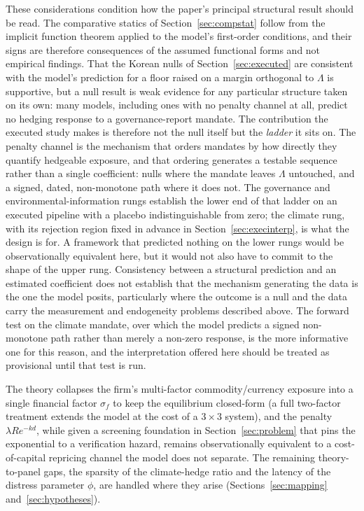 \documentclass[11pt,a4paper]{article}
\begin{document}
These considerations condition how the paper's principal structural result should be read. The comparative statics of Section~\ref{sec:compstat} follow from the implicit function theorem applied to the model's first-order conditions, and their signs are therefore consequences of the assumed functional forms and not empirical findings. That the Korean nulls of Section~\ref{sec:executed} are consistent with the model's prediction for a floor raised on a margin orthogonal to $\Lambda$ is supportive, but a null result is weak evidence for any particular structure taken on its own: many models, including ones with no penalty channel at all, predict no hedging response to a governance-report mandate. The contribution the executed study makes is therefore not the null itself but the \emph{ladder} it sits on. The penalty channel is the mechanism that orders mandates by how directly they quantify hedgeable exposure, and that ordering generates a testable sequence rather than a single coefficient: nulls where the mandate leaves $\Lambda$ untouched, and a signed, dated, non-monotone path where it does not. The governance and environmental-information rungs establish the lower end of that ladder on an executed pipeline with a placebo indistinguishable from zero; the climate rung, with its rejection region fixed in advance in Section~\ref{sec:execinterp}, is what the design is for. A framework that predicted nothing on the lower rungs would be observationally equivalent here, but it would not also have to commit to the shape of the upper rung. Consistency between a structural prediction and an estimated coefficient does not establish that the mechanism generating the data is the one the model posits, particularly where the outcome is a null and the data carry the measurement and endogeneity problems described above. The forward test on the climate mandate, over which the model predicts a signed non-monotone path rather than merely a non-zero response, is the more informative one for this reason, and the interpretation offered here should be treated as provisional until that test is run.

The theory collapses the firm's multi-factor commodity/currency exposure into a single financial factor $\sigma_f$ to keep the equilibrium closed-form (a full two-factor treatment extends the model at the cost of a $3\times3$ system), and the penalty $\lambda R e^{-kd}$, while given a screening foundation in Section~\ref{sec:problem} that pins the exponential to a verification hazard, remains observationally equivalent to a cost-of-capital repricing channel the model does not separate. The remaining theory-to-panel gaps, the sparsity of the climate-hedge ratio and the latency of the distress parameter $\phi$, are handled where they arise (Sections~\ref{sec:mapping} and~\ref{sec:hypotheses}).
\end{document}
